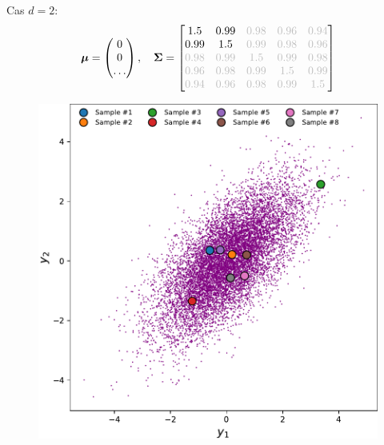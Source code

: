 \documentclass[xcolor=svgnames, t]{beamer}
\newcommand{\vectorx}[1]{\boldsymbol{\MakeLowercase{\mathbf{#1}}}}
\newcommand{\matrixx}[1]{\boldsymbol{\MakeUppercase{#1}}}
\begin{document}
\begin{frame}
  Cas $d=2$:
  \begin{equation*}
    \vectorx{\mu}
    =
    \begin{pmatrix}
      0 \\
      0 \\
      \dots
    \end{pmatrix},
    \quad
    \matrixx{\Sigma}
    =
    \begin{bmatrix}
      1.5 & 0.99 & \color{lightgray}0.98 & \color{lightgray}0.96 & \color{lightgray}0.94 \\
      0.99 & 1.5 & \color{lightgray}0.99 & \color{lightgray}0.98 & \color{lightgray}0.96 \\
      \color{lightgray}0.98 & \color{lightgray}0.99 & \color{lightgray}1.5 & \color{lightgray}0.99 & \color{lightgray}0.98 \\
      \color{lightgray}0.96 & \color{lightgray}0.98 & \color{lightgray}0.99 & \color{lightgray}1.5 & \color{lightgray}0.99 \\
      \color{lightgray}0.94 & \color{lightgray}0.96 & \color{lightgray}0.98 & \color{lightgray}0.99 & \color{lightgray}1.5
      \end{bmatrix}
  \end{equation*}
  \begin{figure}[ht]
    \includegraphics[scale=0.3]{gaussian_2d_2outof5.pdf}

\end{figure}
\end{frame}
\end{document}
